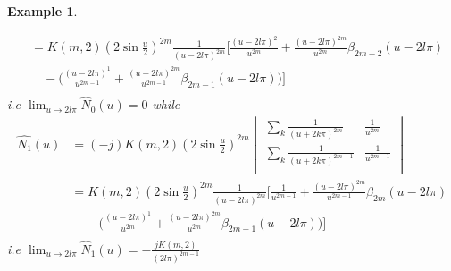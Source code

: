 \documentclass[a4paper, 11pt]{article}
\newtheorem{example}{Example}
\begin{document}
\begin{example}
\begin{enumerate}
\begin{itemize}
\begin{align*}
	      &=  K(m,2) {\left(2 \sin \frac{u}{2} \right)}^{2m} \frac{1}{(u-2l\pi)^{2m}} \bigg[ 
		\frac{{(u-2l\pi)}^2}{u^{2m}} + \frac{{(u-2l\pi)}^{2m}}{u^{2m}} \beta_{2m-2}(u-2l\pi) \\
	      & \quad - \Big( \frac{{(u-2l\pi)}^1}{u^{2m-1}} + \frac{{(u-2l\pi)}^{2m}}{u^{2m-1}} 
	    \beta_{2m-1}(u-2l\pi)\Big) \bigg] \\
	    \end{align*}
	    i.e $\displaystyle \lim_{u \to 2l\pi} \hat{N}_0(u) = 0$ while
	    \begin{align*}
	      \hat{N_1}(u) &= (-j)K(m,2) {\left(2 \sin \frac{u}{2} \right)}^{2m}   
	      \begin{vmatrix}
		\sum_{k} \frac{1}{{(u+2k\pi)}^{2m}} & \frac{1}{u^{2m}}  \\
		\sum_{k} \frac{1}{{(u+2k\pi)}^{2m-1}} & \frac{1}{u^{2m-1}}  \\
	      \end{vmatrix} \\
	      &=  K(m,2) {\left(2 \sin \frac{u}{2} \right)}^{2m} \frac{1}{(u-2l\pi)^{2m}} \bigg[ \frac{1}{u^{2m-1}} + 
		\frac{{(u-2l\pi)}^{2m}}{u^{2m-1}} \beta_{2m}(u-2l\pi) \\
	      & \quad - \Big( \frac{{(u-2l\pi)}^1}{u^{2m}} + \frac{{(u-2l\pi)}^{2m}}{u^{2m}} \beta_{2m-1}(u-2l\pi)\Big) 
	    \bigg] \\
	    \end{align*}
	    i.e $\displaystyle \lim_{u \to 2l\pi} \hat{N}_1(u) = -\frac{jK(m,2)}{{(2l\pi)}^{2m-1}}$
      \end{itemize}


\end{enumerate}
\end{example}
\end{document}
